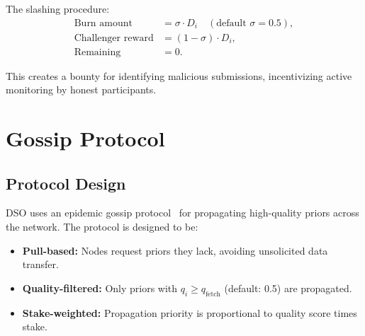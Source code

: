 \documentclass[11pt]{article}
\begin{document}
The slashing procedure:
\begin{align}
    \text{Burn amount} &= \sigma \cdot D_i \quad (\text{default } \sigma = 0.5), \\
    \text{Challenger reward} &= (1 - \sigma) \cdot D_i, \\
    \text{Remaining} &= 0.
\end{align}

This creates a bounty for identifying malicious submissions, incentivizing
active monitoring by honest participants.

\section{Gossip Protocol}
\label{sec:gossip}

\subsection{Protocol Design}

DSO uses an epidemic gossip protocol~\cite{demers1987epidemic} for propagating
high-quality priors across the network. The protocol is designed to be:
\begin{itemize}[leftmargin=1.5em]
    \item \textbf{Pull-based:} Nodes request priors they lack, avoiding
          unsolicited data transfer.
    \item \textbf{Quality-filtered:} Only priors with $q_i \geq q_{\text{fetch}}$
          (default: 0.5) are propagated.
    \item \textbf{Stake-weighted:} Propagation priority is proportional to
          quality score times stake.
\end{itemize}
\end{document}
